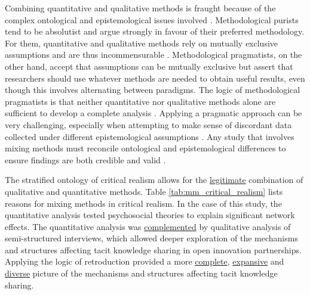 Combining quantitative and qualitative methods is fraught because of the complex ontological and epistemological issues involved \citep{giddings2006mixed,mcevoy2006critical}. Methodological purists tend to be absolutist and argue strongly in favour of their preferred methodology. For them, quantitative and qualitative methods rely on mutually exclusive assumptions and are thus incommensurable \citep{greene2008mixed}. Methodological pragmatists, on the other hand, accept that assumptions can be mutually exclusive but assert that researchers should use whatever methods are needed to obtain useful results, even though this involves alternating between paradigms. The logic of methodological pragmatists is that neither quantitative nor qualitative methods alone are sufficient to develop a complete analysis \citep{mcevoy2006critical,creswell2013research}. Applying a pragmatic approach can be very challenging, especially when attempting to make sense of discordant data collected under different epistemological assumptions \citep{johnson2004mixed,giddings2006mixed}. Any study that involves mixing methods must reconcile ontological and epistemological differences to ensure findings are both credible and valid \citep{zachariadis2013methodological}. \medskip

The stratified ontology of critical realism allows for the \underline{legitimate} combination of qualitative and quantitative methods. Table \ref{tab:mm_critical_realism} lists reasons for mixing methods in critical realism. In the case of this study, the quantitative analysis tested psychosocial theories to explain significant network effects. The quantitative analysis was \underline{complemented} by qualitative analysis of semi-structured interviews, which allowed deeper exploration of the mechanisms and structures affecting tacit knowledge sharing in open innovation partnerships. Applying the logic of retroduction provided a more \underline{complete}, \underline{expansive} and \underline{diverse} picture of the mechanisms and structures affecting tacit knowledge sharing. 

